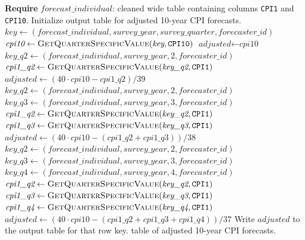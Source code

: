 \documentclass[11pt]{article}
\begin{document}
\begin{algorithm}[H]
\caption{\textsc{AdjustCPI10Forecasts}$(\textit{forecast\_individual})$}
\begin{algorithmic}[1]
\State \textbf{Require} $\textit{forecast\_individual}$: cleaned wide table
\Statex \quad containing columns \texttt{CPI1} and \texttt{CPI10}.
\State Initialize output table for adjusted 10-year CPI forecasts.
    \State $\textit{key} \gets (\textit{forecast\_individual}, \textit{survey\_year}, \textit{survey\_quarter}, \textit{forecaster\_id})$
    \State $\textit{cpi10} \gets \textsc{GetQuarterSpecificValue}(\textit{key}, \texttt{CPI10})$
        \State $\textit{adjusted} \gets \textit{cpi10}$
        \State $\textit{key\_q2} \gets (\textit{forecast\_individual}, \textit{survey\_year}, 2, \textit{forecaster\_id})$
        \State $\textit{cpi1\_q2} \gets \textsc{GetQuarterSpecificValue}(\textit{key\_q2}, \texttt{CPI1})$
        \State $\textit{adjusted} \gets (40\cdot\textit{cpi10} - \textit{cpi1\_q2})/39$
        \State $\textit{key\_q2} \gets (\textit{forecast\_individual}, \textit{survey\_year}, 2, \textit{forecaster\_id})$
        \State $\textit{key\_q3} \gets (\textit{forecast\_individual}, \textit{survey\_year}, 3, \textit{forecaster\_id})$
        \State $\textit{cpi1\_q2} \gets \textsc{GetQuarterSpecificValue}(\textit{key\_q2}, \texttt{CPI1})$
        \State $\textit{cpi1\_q3} \gets \textsc{GetQuarterSpecificValue}(\textit{key\_q3}, \texttt{CPI1})$
        \State $\textit{adjusted} \gets (40\cdot\textit{cpi10} - (\textit{cpi1\_q2} + \textit{cpi1\_q3}))/38$
    \Else
        \State $\textit{key\_q2} \gets (\textit{forecast\_individual}, \textit{survey\_year}, 2, \textit{forecaster\_id})$
        \State $\textit{key\_q3} \gets (\textit{forecast\_individual}, \textit{survey\_year}, 3, \textit{forecaster\_id})$
        \State $\textit{key\_q4} \gets (\textit{forecast\_individual}, \textit{survey\_year}, 4, \textit{forecaster\_id})$
        \State $\textit{cpi1\_q2} \gets \textsc{GetQuarterSpecificValue}(\textit{key\_q2}, \texttt{CPI1})$
        \State $\textit{cpi1\_q3} \gets \textsc{GetQuarterSpecificValue}(\textit{key\_q3}, \texttt{CPI1})$
        \State $\textit{cpi1\_q4} \gets \textsc{GetQuarterSpecificValue}(\textit{key\_q4}, \texttt{CPI1})$
        \State $\textit{adjusted} \gets (40\cdot\textit{cpi10} - (\textit{cpi1\_q2} + \textit{cpi1\_q3} + \textit{cpi1\_q4}))/37$
    \EndIf
    \State Write $\textit{adjusted}$ to the output table for that row key.
\EndFor
\State \Return table of adjusted 10-year CPI forecasts.
\end{algorithmic}
\end{algorithm}
\end{document}
